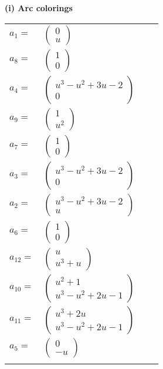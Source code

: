 \documentclass[1p]{elsarticle_modified}
\theoremstyle{definition}
\begin{document}
\flushleft \textbf{(i) Arc colorings}\\
\begin{tabular}{m{7pt} m{180pt} m{7pt} m{180pt} }
\flushright $a_{1}=$&$\begin{pmatrix}0\\u\end{pmatrix}$ \\
\flushright $a_{8}=$&$\begin{pmatrix}1\\0\end{pmatrix}$ \\
\flushright $a_{4}=$&$\begin{pmatrix}u^3- u^2+3 u-2\\0\end{pmatrix}$ \\
\flushright $a_{9}=$&$\begin{pmatrix}1\\u^2\end{pmatrix}$ \\
\flushright $a_{7}=$&$\begin{pmatrix}1\\0\end{pmatrix}$ \\
\flushright $a_{3}=$&$\begin{pmatrix}u^3- u^2+3 u-2\\0\end{pmatrix}$ \\
\flushright $a_{2}=$&$\begin{pmatrix}u^3- u^2+3 u-2\\u\end{pmatrix}$ \\
\flushright $a_{6}=$&$\begin{pmatrix}1\\0\end{pmatrix}$ \\
\flushright $a_{12}=$&$\begin{pmatrix}u\\u^3+u\end{pmatrix}$ \\
\flushright $a_{10}=$&$\begin{pmatrix}u^2+1\\u^3- u^2+2 u-1\end{pmatrix}$ \\
\flushright $a_{11}=$&$\begin{pmatrix}u^3+2 u\\u^3- u^2+2 u-1\end{pmatrix}$ \\
\flushright $a_{5}=$&$\begin{pmatrix}0\\- u\end{pmatrix}$\\&\end{tabular}
\end{document}
